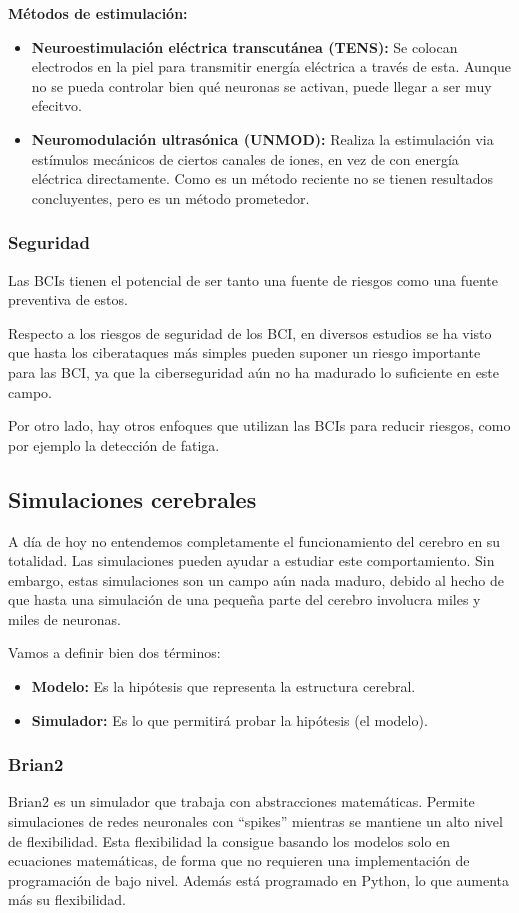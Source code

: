 \documentclass[12pt, letterpaper]{article}
\begin{document}
\textbf{Métodos de estimulación:}
\begin{itemize}
    \item \textbf{Neuroestimulación eléctrica transcutánea (TENS):} Se colocan electrodos en la piel para transmitir energía eléctrica a través de esta. Aunque no se pueda controlar bien qué neuronas se activan, puede llegar a ser muy efecitvo.
    \item \textbf{Neuromodulación ultrasónica (UNMOD):} Realiza la estimulación via estímulos mecánicos de ciertos canales de iones, en vez de con energía eléctrica directamente. Como es un método reciente no se tienen resultados concluyentes, pero es un método prometedor.
\end{itemize}

\subsubsection{Seguridad}
Las BCIs tienen el potencial de ser tanto una fuente de riesgos como una fuente preventiva de estos.

Respecto a los riesgos de seguridad de los BCI, en diversos estudios se ha visto que hasta los ciberataques más simples pueden suponer un riesgo importante para las BCI, ya que la ciberseguridad aún no ha madurado lo suficiente en este campo.

Por otro lado, hay otros enfoques que utilizan las BCIs para reducir riesgos, como por ejemplo la detección de fatiga.

\subsection{Simulaciones cerebrales}
A día de hoy no entendemos completamente el funcionamiento del cerebro en su totalidad. Las simulaciones pueden ayudar a estudiar este comportamiento. Sin embargo, estas simulaciones son un campo aún nada maduro, debido al hecho de que hasta una simulación de una pequeña parte del cerebro involucra miles y miles de neuronas.

Vamos a definir bien dos términos:
\begin{itemize}
    \item \textbf{Modelo:} Es la hipótesis que representa la estructura cerebral.
    \item \textbf{Simulador:} Es lo que permitirá probar la hipótesis (el modelo).
\end{itemize}


\subsubsection{Brian2}
Brian2 es un simulador que trabaja con abstracciones matemáticas. Permite simulaciones de redes neuronales con ``spikes'' mientras se mantiene un alto nivel de flexibilidad. Esta flexibilidad la consigue basando los modelos solo en ecuaciones matemáticas, de forma que no requieren una implementación de programación de bajo nivel. Además está programado en Python, lo que aumenta más su flexibilidad.
\end{document}
